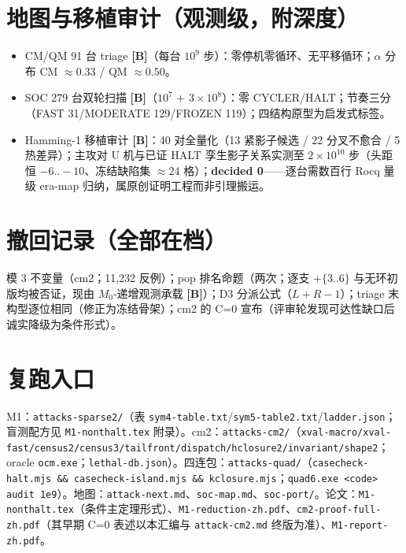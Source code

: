 \documentclass[11pt]{ctexart}
\newcommand{\grB}{\textbf{[B]}}
\begin{document}
\section{地图与移植审计（观测级，附深度）}
\begin{itemize}
\item CM/QM 91 台 triage \grB{}（每台 $10^9$ 步）：零停机零循环、无平移循环；$\alpha$ 分布 CM $\approx0.33$ / QM $\approx0.50$。
\item SOC 279 台双轮扫描 \grB{}（$10^7$ + $3\times10^8$）：零 CYCLER/HALT；节奏三分（FAST 31/MODERATE 129/FROZEN 119）；四结构原型为启发式标签。
\item Hamming-1 移植审计 \grB{}：40 对全量化（13 紧影子候选 / 22 分叉不愈合 / 5 热差异）；主攻对 U 机与已证 HALT 孪生影子关系实测至 $2\times10^{10}$ 步（头距恒 $-6..-10$、冻结缺陷集 $\approx24$ 格）；\textbf{decided 0}——逐台需数百行 Rocq 量级 era-map 归纳，属原创证明工程而非引理搬运。
\end{itemize}

\section{撤回记录（全部在档）}
模 3 不变量（cm2；11,232 反例）；pop 排名命题（两次；逐支 $+\{3..6\}$ 与无环初版均被否证，现由 $M_0$-递增观测承载 \grB{}）；D3 分派公式（$L{+}R{-}1$）；triage 末构型逐位相同（修正为冻结骨架）；cm2 的 C=0 宣布（评审轮发现可达性缺口后诚实降级为条件形式）。

\section{复跑入口}
M1：\texttt{attacks-sparse2/}（表 \texttt{sym4-table.txt}/\texttt{sym5-table2.txt}/\texttt{ladder.json}；盲测配方见 \texttt{M1-nonthalt.tex} 附录）。cm2：\texttt{attacks-cm2/}（\texttt{xval-macro/xval-fast/census2/census3/tailfront/dispatch/hclosure2/invariant/shape2}；oracle \texttt{ocm.exe}；\texttt{lethal-db.json}）。四连包：\texttt{attacks-quad/}（\texttt{casecheck-halt.mjs \&\& casecheck-island.mjs \&\& kclosure.mjs}；\texttt{quad6.exe <code> audit 1e9}）。地图：\texttt{attack-next.md}、\texttt{soc-map.md}、\texttt{soc-port/}。论文：\texttt{M1-nonthalt.tex}（条件主定理形式）、\texttt{M1-reduction-zh.pdf}、\texttt{cm2-proof-full-zh.pdf}（其早期 C=0 表述以本汇编与 \texttt{attack-cm2.md} 终版为准）、\texttt{M1-report-zh.pdf}。
\end{document}
